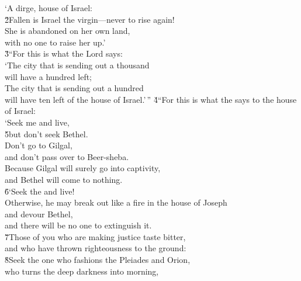 \begin{poetry}
\poeml `A dirge, house of Israel: \\
\poeml \v{2}Fallen is Israel the virgin---never to rise again! \\
\poemll    She is abandoned on her own land, \\
\poemlll       with no one to raise her up.' \\
\poeml \v{3}``For this is what the Lord  says: \\
\poeml `The city that is sending out a thousand \\
\poemll    will have a hundred left; \\
\poeml The city that is sending out a hundred \\
\poemll    will have ten left of the house of Israel.'\,''
\poeml \v{4}``For this is what the  says to the house of Israel: \\
\poeml `Seek me and live, \\
\poeml \v{5}but don't seek Bethel. \\
\poeml Don't go to Gilgal, \\
\poemlll       and don't pass over to Beer-sheba. \\
\poeml Because Gilgal will surely go into captivity, \\
\poemll    and Bethel will come to nothing. \\
\poeml \v{6}`Seek the  and live! \\
\poemll    Otherwise, he may break out like a fire in the house of Joseph \\
\poemlll       and devour Bethel, \\
\poemll    and there will be no one to extinguish it. \\
\poeml \v{7}Those of you who are making justice taste bitter, \\
\poemll    and who have thrown righteousness to the ground: \\
\poeml \v{8}Seek the one who fashions the Pleiades and Orion, \\
\poemll    who turns the deep darkness into morning, \\

\end{poetry}
